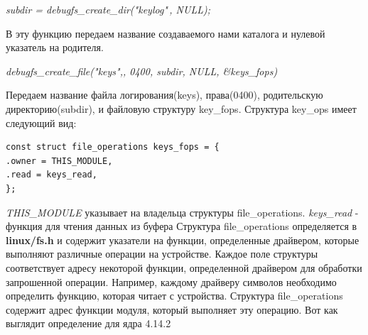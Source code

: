 \textit{subdir = debugfs\_create\_dir("keylog"\,, NULL);}

В эту функцию передаем название создаваемого нами каталога и нулевой указатель на родителя.

\textit{debugfs\_create\_file("keys",, 0400, subdir, NULL, \&keys\_fops)}

Передаем название файла логирования(keys), права(0400), родительскую директорию(subdir), и файловую структуру key\_fops.
Структура key\_ops имеет следующий вид:

 \begin{lstlisting}[style=pseudocode,caption={struct file\_operations keys\_fops}] 
const struct file_operations keys_fops = {
.owner = THIS_MODULE,
.read = keys_read,
};
 \end{lstlisting}

\textit{THIS\_MODULE}  указывает на владельца структуры file\_operations.
\textit{keys\_read} - функция для чтения данных из буфера
Структура file\_operations определяется в \textbf{linux/fs.h} и содержит указатели на функции, определенные драйвером, которые выполняют различные операции на устройстве. Каждое поле структуры соответствует адресу некоторой функции, определенной драйвером для обработки запрошенной операции. Например, каждому драйверу символов необходимо определить функцию, которая читает с устройства. Структура file\_operations содержит адрес функции модуля, который выполняет эту операцию. Вот как выглядит определение для ядра 4.14.2
